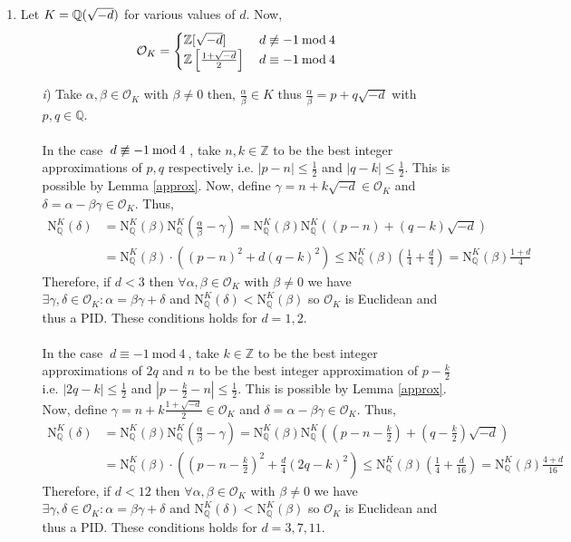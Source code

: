 \documentclass[12pt]{extarticle}
\newcommand{\Z}{\mathbb{Z}}
\newcommand{\Q}{\mathbb{Q}}
\renewcommand{\mod}[3]{\: #1 \equiv #2 \: \mathrm{mod} \: #3 \:}
\newcommand{\nmod}[3]{\: #1 \centernot \equiv #2 \: \mathrm{mod} \: #3 \:}
\newcommand{\quadfield}[1]{\Q \small(\sqrt{#1} \small)}
\newcommand{\ints}[1]{\mathcal{O}_{#1}}
\newcommand{\qnorm}[2]{\mathrm{N}^{#1}_{\Q}\left(#2\right)}
\begin{document}
\begin{enumerate}
\item Let $K = \quadfield{-d}$ for various values of $d$. Now, \[\ints{K} = \begin{cases} \Z[\sqrt{-d}] & \nmod{d}{-1}{4} \\ \Z\left[\frac{1+\sqrt{-d}}{2}\right] & \mod{d}{-1}{4} \end{cases} \]
\begin{enumerate}
\item[\textit{i})] Take $\alpha, \beta \in \ints{K}$ with $\beta \neq 0$ then, $\frac{\alpha}{\beta} \in K$ thus $\frac{\alpha}{\beta} = p + q \sqrt{-d}$ with $p, q \in \Q$. \\ \\
In the case $\nmod{d}{-1}{4}$, take $n,k \in \Z$ to be the best integer approximations of $p,q$ respectively i.e. $|p - n| \le \frac{1}{2}$ and $|q - k| \le \frac{1}{2}$. This is possible by Lemma \ref{approx}. Now, define $\gamma = n + k \sqrt{-d} \in \ints{K}$ and $\delta = \alpha - \beta \gamma \in \ints{K}$. Thus,
\begin{align*}
\qnorm{K}{\delta} &= \qnorm{K}{\beta} \qnorm{K}{\frac{\alpha}{\beta} - \gamma} = \qnorm{K}{\beta} \qnorm{K}{(p - n) + (q - k)\sqrt{-d}} \\ &= \qnorm{K}{\beta} \cdot \left((p - n)^2 + d (q - k)^2 \right) \le \qnorm{K}{\beta}\left(\frac{1}{4} + \frac{d}{4} \right) = \qnorm{K}{\beta} \frac{1 + d}{4}
\end{align*}
Therefore, if $d < 3$ then $\forall \alpha, \beta \in \ints{K}$ with $\beta \neq 0$ we have $\exists \gamma, \delta \in \ints{K} : \alpha = \beta \gamma + \delta$ and $\qnorm{K}{\delta} < \qnorm{K}{\beta}$ so $\ints{K}$ is Euclidean and thus a PID. These conditions holds for $d = 1,2$. \\ \\
In the case $\mod{d}{-1}{4}$, take $k \in \Z$ to be the best integer approximations of $2q$ and $n$ to be the best integer approximation of $p - \frac{k}{2}$ i.e. $|2q - k| \le \frac{1}{2}$ and $|p - \frac{k}{2} - n| \le \frac{1}{2}$. This is possible by Lemma \ref{approx}. Now, define $\gamma = n + k \frac{1 + \sqrt{-d}}{2} \in \ints{K}$ and $\delta = \alpha - \beta \gamma \in \ints{K}$. Thus,
\begin{align*}
\qnorm{K}{\delta} &= \qnorm{K}{\beta} \qnorm{K}{\frac{\alpha}{\beta} - \gamma} = \qnorm{K}{\beta} \qnorm{K}{ \left(p - n - \frac{k}{2} \right) + \left(q - \frac{k}{2} \right)\sqrt{-d}} \\ &= \qnorm{K}{\beta} \cdot \left(\left(p - n - \frac{k}{2} \right)^2 + \frac{d}{4} (2q - k)^2 \right) \le \qnorm{K}{\beta}\left(\frac{1}{4} + \frac{d}{16} \right) = \qnorm{K}{\beta} \frac{4 + d}{16}
\end{align*}
Therefore, if $d < 12$ then $\forall \alpha, \beta \in \ints{K}$ with $\beta \neq 0$ we have $\exists \gamma, \delta \in \ints{K} : \alpha = \beta \gamma + \delta$ and $\qnorm{K}{\delta} < \qnorm{K}{\beta}$ so $\ints{K}$ is Euclidean and thus a PID. These conditions holds for $d = 3, 7, 11$.


\end{enumerate}
\end{enumerate}
\end{document}
